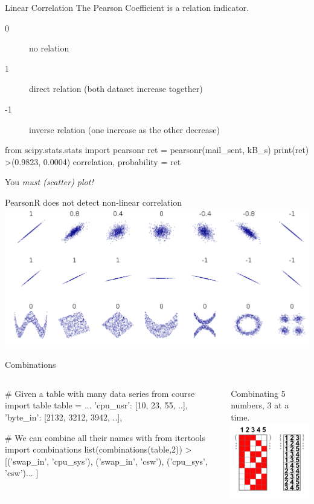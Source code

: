 \begin{pyframe}{Linear Correlation}
The Pearson Coefficient is a relation indicator. 
\begin{description}
\item[0]  no relation
\item[1]  direct relation (both dataset increase together)
\item[-1]  inverse relation (one increase as the other decrease) 
\end{description}

\begin{pycode}
from scipy.stats.stats import pearsonr
ret = pearsonr(mail_sent, kB_s)
print(ret)
>(0.9823, 0.0004)
correlation, probability = ret
\end{pycode}
\end{pyframe}

\begin{pyframe}{You \emph{must (scatter) plot!}}
\LARGE
\begin{center}
PearsonR does not detect non-linear correlation \\
\includegraphics[width=.8\textwidth]{correlation.pdf} \\
\end{center}
\end{pyframe}


\begin{pyframe}{Combinations } %
\begin{columns}
\begin{pycode}
# Given a table with many data series
from course import table
table = {...
  'cpu_usr': [10, 23, 55, ..],
  'byte_in': [2132, 3212, 3942, ..], }

# We can combine all their names with
from itertools import combinations
list(combinations(table,2))
>[('swap_in', 'cpu_sys'),
 ('swap_in', 'csw'),  ('cpu_sys', 'csw')... ]








\end{pycode}
Combinating 5 numbers, 3 at a time.
\includegraphics[width=4cm]{combinations_3.pdf}
\end{columns}
\end{pyframe}


